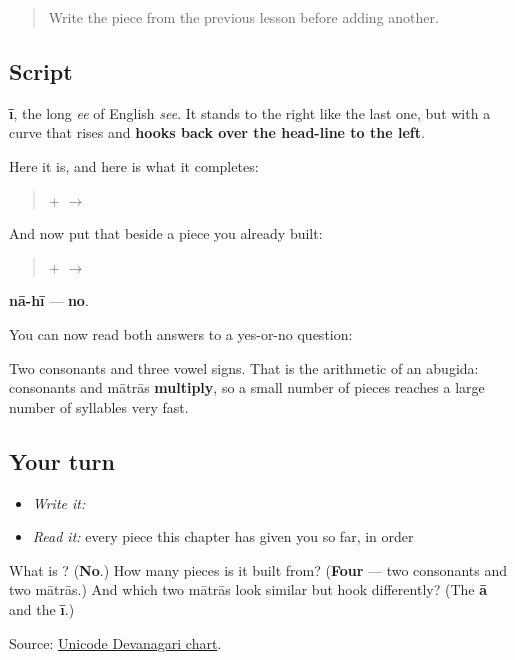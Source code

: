 \label{lesson:MR-W01-ii-matra}



\begin{quote}
Write the piece from the previous lesson before adding another.
\end{quote}

\subsection*{Script}
\begin{quote}
\end{quote}

\textbf{ī}, the long \emph{ee} of English \emph{see}. It stands to the right like the last one, but with a curve that rises and \textbf{hooks back over the head-line to the left}.

Here it is, and here is what it completes:

\begin{quote}
\textbf{} + \textbf{} $\to$ \textbf{}
\end{quote}

And now put that beside a piece you already built:

\begin{quote}
\textbf{} + \textbf{} $\to$ \textbf{}
\end{quote}

\textbf{nā-hī} — \textbf{no}.

You can now read both answers to a yes-or-no question:

\begin{quote}
\textbf{}   \textbf{}
\end{quote}

Two consonants and three vowel signs. That is the arithmetic of an abugida: consonants and mātrās \textbf{multiply}, so a small number of pieces reaches a large number of syllables very fast.

\subsection*{Your turn}
\begin{itemize}
\raggedright
  \item \emph{Write it:} 
  \item \emph{Read it:} every piece this chapter has given you so far, in order
\end{itemize}

\begin{tcolorbox}[breakable,colback=teal!4,colframe=teal!35!black,title={Before you move on}]
What is \textbf{}? (\textbf{No}.) How many pieces is it built from? (\textbf{Four} — two consonants and two mātrās.) And which two mātrās look similar but hook differently? (The \textbf{ā} and the \textbf{ī}.)

Source: \href{https://www.unicode.org/charts/PDF/U0900.pdf}{Unicode Devanagari chart}.
\end{tcolorbox}
